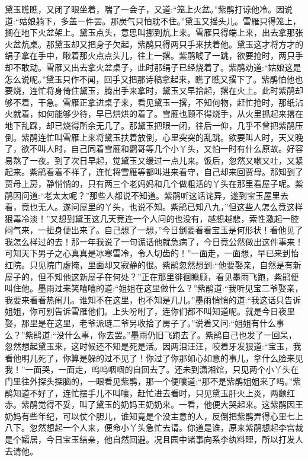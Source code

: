\begin{parag}
    黛玉瞧瞧，又闭了眼坐着，喘了一会子，又道:“笼上火盆。”紫鹃打谅他冷。因说道:“姑娘躺下，多盖一件罢。那炭气只怕耽不住。”黛玉又摇头儿。雪雁只得笼上，搁在地下火盆架上。黛玉点头，意思叫挪到炕上来。雪雁只得端上来，出去拿那张火盆炕桌。那黛玉却又把身子欠起，紫鹃只得两只手来扶着他。黛玉这才将方才的绢子拿在手中，瞅着那火点点头儿，往上一撂。紫鹃唬了一跳，欲要抢时，两只手却不敢动。雪雁又出去拿火盆桌子，此时那绢子已经烧着了。紫鹃劝道:“姑娘这是怎么说呢。”黛玉只作不闻，回手又把那诗稿拿起来，瞧了瞧又撂下了。紫鹃怕他也要烧，连忙将身倚住黛玉，腾出手来拿时，黛玉又早拾起，撂在火上。此时紫鹃却够不着，干急。雪雁正拿进桌子来，看见黛玉一撂，不知何物，赶忙抢时，那纸沾火就着，如何能够少待，早已烘烘的着了。雪雁也顾不得烧手，从火里抓起来撂在地下乱踩，却已烧得所余无几了。那黛玉把眼一闭，往后一仰，几乎不曾把紫鹃压倒。紫鹃连忙叫雪雁上来将黛玉扶着放倒，心里突突的乱跳。欲要叫人时，天又晚了，欲不叫人时，自己同着雪雁和鹦哥等几个小丫头，又怕一时有什么原故。好容易熬了一夜。到了次日早起，觉黛玉又缓过一点儿来。饭后，忽然又嗽又吐，又紧起来。紫鹃看着不祥了，连忙将雪雁等都叫进来看守，自己却来回贾母。那知到了贾母上房，静悄悄的，只有两三个老妈妈和几个做粗活的丫头在那里看屋子呢。紫鹃因问道:“老太太呢？”那些人都说不知道。紫鹃听这话诧异，遂到宝玉屋里去看，竟也无人。遂问屋里的丫头，也说不知。紫鹃已知八九，”但这些人怎么竟这样狠毒冷淡！”又想到黛玉这几天竟连一个人问的也没有，越想越悲，索性激起一腔闷气来，一扭身便出来了。自己想了一想，”今日倒要看看宝玉是何形状！看他见了我怎么样过的去！那一年我说了一句谎话他就急病了，今日竟公然做出这件事来！可知天下男子之心真真是冰寒雪冷，令人切齿的！”一面走，一面想，早已来到怡红院。只见院门虚掩，里面却又寂静的很。紫鹃忽然想到:“他要娶亲，自然是有新屋子的，但不知他这新屋子在何处？”正在那里徘徊瞻顾，看见墨雨飞跑，紫鹃便叫住他。墨雨过来笑嘻嘻的道:“姐姐在这里做什么？”紫鹃道:“我听见宝二爷娶亲，我要来看看热闹儿。谁知不在这里，也不知是几儿。”墨雨悄悄的道:“我这话只告诉姐姐，你可别告诉雪雁他们。上头吩咐了，连你们都不叫知道呢。就是今日夜里娶，那里是在这里，老爷派琏二爷另收拾了房子了。”说着又问:“姐姐有什么事么？”紫鹃道:“没什么事，你去罢。”墨雨仍旧飞跑去了。紫鹃自己也发了一回呆，忽然想起黛玉来，这时候还不知是死是活。因两泪汪汪，咬着牙发狠道:“宝玉，我看他明儿死了，你算是躲的过不见了！你过了你那如心如意的事儿，拿什么脸来见我！”一面哭，一面走，呜呜咽咽的自回去了。还未到潇湘馆，只见两个小丫头在门里往外探头探脑的，一眼看见紫鹃，那一个便嚷道:“那不是紫鹃姐姐来了吗。”紫鹃知道不好了，连忙摆手儿不叫嚷，赶忙进去看时，只见黛玉肝火上炎，两颧红赤。紫鹃觉得不妥，叫了黛玉的奶妈王奶奶来。一看，他便大哭起来。这紫鹃因王奶妈有些年纪，可以仗个胆儿，谁知竟是个没主意的人，反倒把紫鹃弄得心里七上八下。忽然想起一个人来，便命小丫头急忙去请。你道是谁，原来紫鹃想起李宫裁是个孀居，今日宝玉结亲，他自然回避。况且园中诸事向系李纨料理，所以打发人去请他。
\end{parag}


